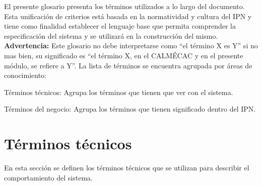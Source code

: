 
	El presente glosario presenta los términos utilizados a lo largo del documento. Esta unificación de criterios está basada en la normatividad y cultura del IPN y tiene como finalidad establecer el lenguaje base que permita comprender la especificación del sistema y se utilizará en la construcción del mismo. 
	{\color{red}\bf Advertencia:} Este glosario no debe interpretarse como ``el término X es Y'' si no mas bien, su significado es ``el término X, en el CALMÉCAC y en el presente módulo, se refiere a Y''. La lista de términos se encuentra agrupada por áreas de conocimiento:

	\begin{Citemize}
		\item Términos técnicos: Agrupa los términos que tienen que ver con el sistema.
		\item Términos del negocio: Agrupa los términos que tienen significado dentro del IPN.
	\end{Citemize}


\section{Términos técnicos}
\label{gls:terminosTecnicos}

En esta sección se definen los términos técnicos que se utilizan para describir el comportamiento del sistema.

